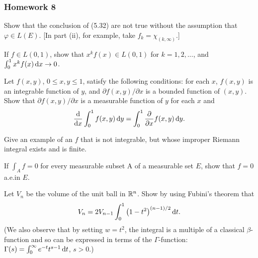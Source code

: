 \subsubsection{Homework 8}
\begin{problem}
  Show that the conclusion of (5.32) are not true without the assumption
  that $\varphi\in L(E)$. [In part (ii), for example, take
  $f_k=\chi_{(k,\infty)}$.]
\end{problem}
\begin{solution}
\end{solution}

\begin{problem}
  If $f\in L(0,1)$, show that $x^kf(x)\in L(0,1)$ for $k=1,2,...$, and
  $\int_0^1 x^kf(x)\mathop{}\!\mathrm{d} x\to 0$.
\end{problem}
\begin{solution}
\end{solution}

\begin{problem}
  Let $f(x,y)$, $0\leq x,y\leq 1$, satisfy the following conditions: for
  each $x$, $f(x,y)$ is an integrable function of $y$, and
  $\partial f(x,y)/\partial x$ is a bounded function of $(x,y)$. Show that
  $\partial f(x,y)/\partial x$ is a measurable function of $y$ for each $x$
  and
  \[
    \frac{\mathrm{d}}{\mathrm{d} x}\int_0^1f(x,y)\mathop{}\!\mathrm{d}
    y=\int_0^1\frac{\partial}{\partial x}f(x,y)\mathop{}\!\mathrm{d} y.
  \]
\end{problem}
\begin{solution}
\end{solution}

\begin{problem}
  Give an example of an $f$ that is not integrable, but whose improper
  Riemann integral exists and is finite.
\end{problem}
\begin{solution}
\end{solution}

\begin{problem}
  If $\int_A f=0$ for every measurable subset A of a measurable set $E$,
  show that $f=0$ a.e.\@ in $E$.
\end{problem}
\begin{solution}
\end{solution}

\begin{problem}
  Let $V_n$ be the volume of the unit ball in $\mathbb{R}^n$. Show by using
  Fubini's theorem that
  \[
    V_n=2V_{n-1}\int_0^1\left(1-t^2\right)^{(n-1)/2}\mathop{}\!\mathrm{d} t.
  \]
  (We also observe that by setting $w=t^2$, the integral is a multiple of a
  classical $\beta$-function and so can be expressed in terms of the
  $\Gamma$-function: $\Gamma(s)=\int_0^\infty e^{-t}t^{s-1}\mathop{}\!\mathrm{d} t$,
  $s>0$.)
\end{problem}
\begin{solution}
\end{solution}


